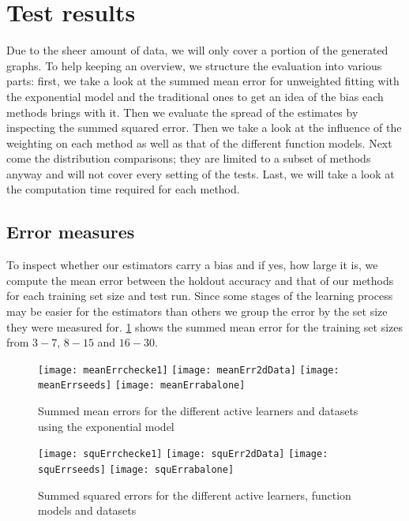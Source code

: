 \section{Test results}

Due to the sheer amount of data, we will only cover a portion of the generated graphs. To help keeping an overview, we structure the evaluation into various parts: first, we take a look at the summed mean error for unweighted fitting with the exponential model and the traditional ones to get an idea of the bias each methods brings with it. Then we evaluate the spread of the estimates by inspecting the summed squared error. Then we take a look at the influence of the weighting on each method as well as that of the different function models. Next come the distribution comparisons; they are limited to a subset of methods anyway and will not cover every setting of the tests. Last, we will take a look at the computation time required for each method.

\subsection{Error measures}

To inspect whether our estimators carry a bias and if yes, how large it is, we compute the mean error between the holdout accuracy and that of our methods for each training set size and test run. Since some stages of the learning process may be easier for the estimators than others we group the error by the set size they were measured for. \ref{fig:meanErrorBars} shows the summed mean error for the training set sizes from $3-7$, $8-15$ and $16-30$.

\begin{figure}[h]
	\centering
	\texttt{[image: meanErrchecke1]}
	\texttt{[image: meanErr2dData]}
	\texttt{[image: meanErrseeds]}
	\texttt{[image: meanErrabalone]}
	\caption{Summed mean errors for the different active learners and datasets using the exponential model}
	\label{fig:meanErrorBars}
\end{figure}



\begin{figure}[h]
	\centering
	\texttt{[image: squErrchecke1]}
	\texttt{[image: squErr2dData]}
	\texttt{[image: squErrseeds]}
	\texttt{[image: squErrabalone]}
	\caption{Summed squared errors for the different active learners, function models and datasets}
	\label{fig:squaredErrorBars}
\end{figure}


